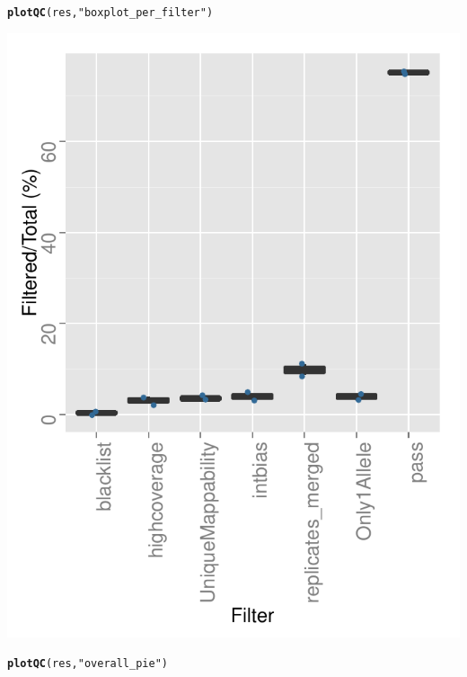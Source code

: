 \documentclass{article}\usepackage[]{graphicx}\usepackage[usenames,dvipsnames]{color}
\makeatletter
\def\maxwidth{ %
  \ifdim\Gin@nat@width>\linewidth
    \linewidth
  \else
    \Gin@nat@width
  \fi
}
\newcommand{\hlstr}[1]{\textcolor[rgb]{0.192,0.494,0.8}{#1}}%
\newcommand{\hlstd}[1]{\textcolor[rgb]{0.345,0.345,0.345}{#1}}%
\newcommand{\hlkwd}[1]{\textcolor[rgb]{0.737,0.353,0.396}{\textbf{#1}}}%
\newenvironment{kframe}{%
 \def\at@end@of@kframe{}%
 \ifinner\ifhmode%
  \def\at@end@of@kframe{\end{minipage}}%
  \begin{minipage}{\columnwidth}%
 \fi\fi%
 \def\FrameCommand##1{\hskip\@totalleftmargin \hskip-\fboxsep
 \colorbox{shadecolor}{##1}\hskip-\fboxsep
     \hskip-\linewidth \hskip-\@totalleftmargin \hskip\columnwidth}%
 \MakeFramed {\advance\hsize-\width
   \@totalleftmargin\z@ \linewidth\hsize
   \@setminipage}}%
 {\par\unskip\endMakeFramed%
 \at@end@of@kframe}
\newenvironment{knitrout}{}{} %
\makeatother
\begin{document}
\begin{knitrout}
{}


\begin{kframe}\begin{alltt}
\hlkwd{plotQC}\hlstd{(res,} \hlstr{"boxplot_per_filter"}\hlstd{)}
\end{alltt}
\end{kframe}

{\centering \includegraphics[width=\maxwidth]{figure/QCplots-2} 

}


\begin{kframe}\begin{alltt}
\hlkwd{plotQC}\hlstd{(res,} \hlstr{"overall_pie"}\hlstd{)}
\end{alltt}
\end{kframe}


\end{knitrout}
\end{document}
